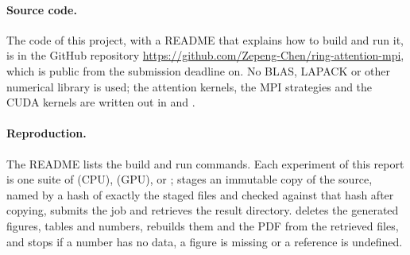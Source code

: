 \begin{sloppypar}
\paragraph{Source code.} The code of this project, with a README that explains how
to build and run it, is in the GitHub repository
\url{https://github.com/Zepeng-Chen/ring-attention-mpi}, which is public from the
submission deadline on. No BLAS, LAPACK or other
numerical library is used; the attention kernels, the MPI strategies and the CUDA
kernels are written out in  and .

\paragraph{Reproduction.} The README lists the build and run commands. Each experiment
of this report is one suite of  (CPU),
 (GPU),  or ;
 stages an immutable copy of the source, named by a hash
of exactly the staged files and checked against that hash after copying, submits
the job and retrieves the result directory.  deletes the generated figures,
tables and numbers, rebuilds them and the PDF from the retrieved files, and stops if
a number has no data, a figure is missing or a reference is undefined.


\end{sloppypar}
